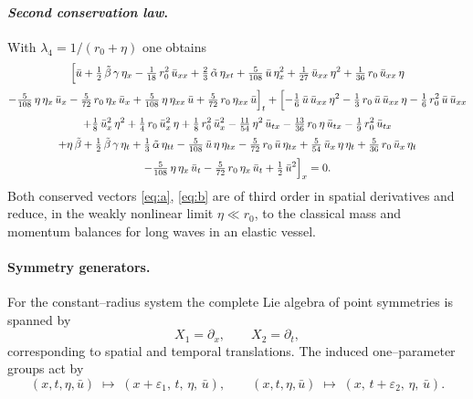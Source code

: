 \documentclass[alpha-refs, 12pt]{wiley-article}
\begin{document}
\paragraph{\textit{Second conservation law}.} With $\displaystyle\lambda_{4}=1/(r_{0}+\eta)$ one obtains
\begin{multline}\label{eq:b}
  \Bigl[
        \bar{u}
        +\tfrac12\,\tilde{\beta}\,\gamma\,\eta_{x}
        -\tfrac1{18}\,r_{0}^{2}\,\bar{u}_{xx}
        +\tfrac23\,\tilde{\alpha}\,\eta_{xt}
        +\tfrac{5}{108}\,\bar{u}\,\eta_{x}^{2}
        +\tfrac1{27}\,\bar{u}_{xx}\,\eta^{2}
        +\tfrac1{36}\,r_{0}\,\bar{u}_{xx}\,\eta
        \\[2pt]
        -\tfrac{5}{108}\,\eta\,\eta_{x}\,\bar{u}_{x}
        -\tfrac{5}{72}\,r_{0}\,\eta_{x}\,\bar{u}_{x}
        +\tfrac{5}{108}\,\eta\,\eta_{xx}\,\bar{u}
        +\tfrac{5}{72}\,r_{0}\,\eta_{xx}\,\bar{u}
  \Bigr]_{t}
  +\Bigl[
        -\tfrac16\,\bar{u}\,\bar{u}_{xx}\,\eta^{2}
        -\tfrac13\,r_{0}\,\bar{u}\,\bar{u}_{xx}\,\eta
        -\tfrac16\,r_{0}^{2}\,\bar{u}\,\bar{u}_{xx}
        \\[2pt]
        +\tfrac18\,\bar{u}_{x}^{2}\,\eta^{2}
        +\tfrac14\,r_{0}\,\bar{u}_{x}^{2}\,\eta
        +\tfrac18\,r_{0}^{2}\,\bar{u}_{x}^{2}
        -\tfrac{11}{54}\,\eta^{2}\,\bar{u}_{tx}
        -\tfrac{13}{36}\,r_{0}\,\eta\,\bar{u}_{tx}
        -\tfrac19\,r_{0}^{2}\,\bar{u}_{tx}
        \\[2pt]
        +\eta\,\tilde{\beta}
        +\tfrac12\,\tilde{\beta}\,\gamma\,\eta_{t}
        +\tfrac13\,\tilde{\alpha}\,\eta_{tt}
        -\tfrac{5}{108}\,\bar{u}\,\eta\,\eta_{tx}
        -\tfrac{5}{72}\,r_{0}\,\bar{u}\,\eta_{tx}
        +\tfrac{5}{54}\,\bar{u}_{x}\,\eta\,\eta_{t}
        +\tfrac{5}{36}\,r_{0}\,\bar{u}_{x}\,\eta_{t}
        \\[2pt]
        -\tfrac{5}{108}\,\eta\,\eta_{x}\,\bar{u}_{t}
        -\tfrac{5}{72}\,r_{0}\,\eta_{x}\,\bar{u}_{t}
        +\tfrac12\,\bar{u}^{2}
  \Bigr]_{x}=0.
\end{multline}
Both conserved vectors \eqref{eq:a}, \eqref{eq:b} are of third order in spatial derivatives and reduce, in the weakly nonlinear limit $\eta \ll r_{0}$, to the classical mass and momentum balances for long waves in an elastic vessel.

\paragraph{Symmetry generators.} For the constant–radius system the complete Lie algebra of point symmetries is spanned by
\[
  X_{1}=\partial_{x},
  \qquad
  X_{2}=\partial_{t},
\]
corresponding to spatial and temporal translations. The induced one–parameter groups act by
\[
  (x,t,\eta,\bar{u})\;\mapsto\;
  (x+\varepsilon_{1},\,t,\,\eta,\,\bar{u}),
  \qquad
  (x,t,\eta,\bar{u})\;\mapsto\;
  (x,\,t+\varepsilon_{2},\,\eta,\,\bar{u}).
\]
\end{document}
